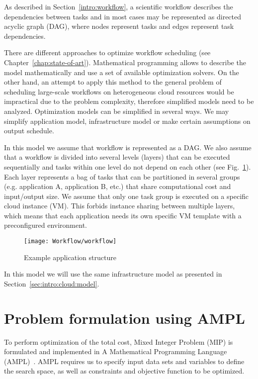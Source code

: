 {    As described in Section \ref{intro:workflow}, a scientific workflow describes the dependencies between tasks and in most cases may be represented as directed acyclic graph (DAG), where nodes represent tasks and edges represent task dependencies. 
    
    There are different approaches to optimize workflow scheduling (see Chapter \ref{chap:state-of-art}). Mathematical programming allows to describe the model mathematically and use a set of available optimization solvers. On the other hand, an attempt to apply this method to the general problem of scheduling large-scale workflows on heterogeneous cloud resources would be impractical due to the problem complexity, therefore simplified models need to be analyzed. Optimization models can be simplified in several ways. We may simplify application model, infrastructure model or make certain assumptions on output schedule.
    
    In this model we assume that workflow is represented as a DAG. We also assume that a workflow is divided into several levels (layers) that can be executed sequentially and tasks within one level do not depend on each other (see Fig.~\ref{fig:workflow:appmodel}). Each layer represents a bag of tasks that can be partitioned in several groups (e.g. application A, application B, etc.) that share computational cost and input/output size. We assume that only one task group is executed on a specific cloud instance (VM). This forbids instance sharing between multiple layers, which means that each application needs its own specific VM template with a preconfigured environment.

    \begin{figure}[tb]
        \centering \texttt{[image: Workflow/workflow]}
        \caption{Example application structure}
        \label{fig:workflow:appmodel}
    \end{figure}
    
    In this model we will use the same infrastructure model as presented in Section~\ref{sec:intro:cloud:model}.
  
    \section{Problem formulation using AMPL}
    \label{sec:workflow:problem}
  
    To perform optimization of the total cost, Mixed Integer Problem (MIP) is formulated and implemented in A Mathematical Programming Language (AMPL)~\cite{Fourer2002}.  AMPL requires us to specify input data sets and variables to define the search space, as well as constraints and objective function to be optimized.
    
}
